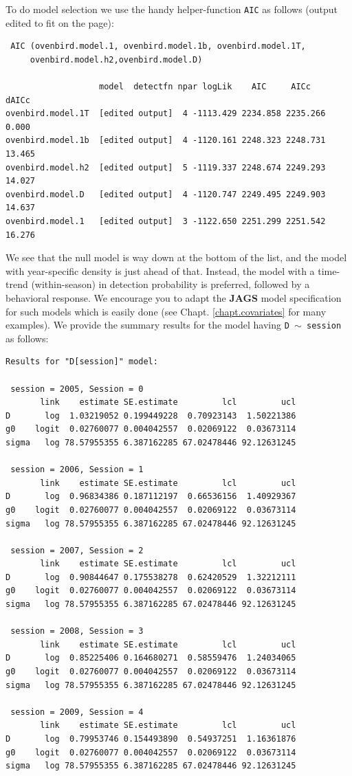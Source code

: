 To do model selection  we use the handy helper-function \mbox{\tt AIC}
as follows (output edited to fit on the page):
{\small
\begin{verbatim}
 AIC (ovenbird.model.1, ovenbird.model.1b, ovenbird.model.1T,
     ovenbird.model.h2,ovenbird.model.D)

                   model  detectfn npar logLik    AIC     AICc     dAICc
ovenbird.model.1T  [edited output]  4 -1113.429 2234.858 2235.266  0.000
ovenbird.model.1b  [edited output]  4 -1120.161 2248.323 2248.731 13.465
ovenbird.model.h2  [edited output]  5 -1119.337 2248.674 2249.293 14.027
ovenbird.model.D   [edited output]  4 -1120.747 2249.495 2249.903 14.637
ovenbird.model.1   [edited output]  3 -1122.650 2251.299 2251.542 16.276
\end{verbatim}
}
We see that the null model is way down at the bottom of the list, and
the model with year-specific density is just ahead of that. Instead,
the model with a time-trend (within-season) in detection probability
is preferred, followed by a behavioral response. We encourage you to
adapt the {\bf JAGS} model specification for such models which is easily
done (see Chapt. \ref{chapt.covariates} for many examples).
We provide the summary results for the model having \mbox{\tt D $\sim$
  session} as follows:
{\small
\begin{verbatim}
Results for "D[session]" model:

 session = 2005, Session = 0
       link    estimate SE.estimate         lcl         ucl
D       log  1.03219052 0.199449228  0.70923143  1.50221386
g0    logit  0.02760077 0.004042557  0.02069122  0.03673114
sigma   log 78.57955355 6.387162285 67.02478446 92.12631245

 session = 2006, Session = 1
       link    estimate SE.estimate         lcl         ucl
D       log  0.96834386 0.187112197  0.66536156  1.40929367
g0    logit  0.02760077 0.004042557  0.02069122  0.03673114
sigma   log 78.57955355 6.387162285 67.02478446 92.12631245

 session = 2007, Session = 2
       link    estimate SE.estimate         lcl         ucl
D       log  0.90844647 0.175538278  0.62420529  1.32212111
g0    logit  0.02760077 0.004042557  0.02069122  0.03673114
sigma   log 78.57955355 6.387162285 67.02478446 92.12631245

 session = 2008, Session = 3
       link    estimate SE.estimate         lcl         ucl
D       log  0.85225406 0.164680271  0.58559476  1.24034065
g0    logit  0.02760077 0.004042557  0.02069122  0.03673114
sigma   log 78.57955355 6.387162285 67.02478446 92.12631245

 session = 2009, Session = 4
       link    estimate SE.estimate         lcl         ucl
D       log  0.79953746 0.154493890  0.54937251  1.16361876
g0    logit  0.02760077 0.004042557  0.02069122  0.03673114
sigma   log 78.57955355 6.387162285 67.02478446 92.12631245
\end{verbatim}
}
